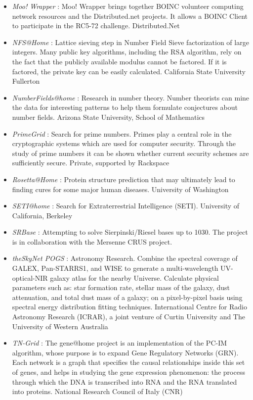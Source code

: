 \begin{itemize}
	\item {\em Moo! Wrapper} : Moo! Wrapper brings together BOINC volunteer computing network resources and the Distributed.net projects. It allows a BOINC Client to participate in the RC5-72 challenge.	Distributed.Net	
	\item {\em NFS@Home} : Lattice sieving step in Number Field Sieve factorization of large integers. Many public key algorithms, including the RSA algorithm, rely on the fact that the publicly available modulus cannot be factored. If it is factored, the private key can be easily calculated.	California State University Fullerton	
	\item {\em NumberFields@home} : Research in number theory. Number theorists can mine the data for interesting patterns to help them formulate conjectures about number fields.	Arizona State University, School of Mathematics	
	\item {\em PrimeGrid} : Search for prime numbers. Primes play a central role in the cryptographic systems which are used for computer security. Through the study of prime numbers it can be shown whether current security schemes are sufficiently secure.	Private, supported by Rackspace
	\item {\em Rosetta@Home} : Protein structure prediction that may ultimately lead to finding cures for some major human diseases.	University of Washington
	\item {\em SETI@home} : Search for Extraterrestrial Intelligence (SETI). University of California, Berkeley
	\item {\em SRBase} : Attempting to solve Sierpinski/Riesel bases up to 1030.	The project is in collaboration with the Mersenne CRUS project.	
	\item {\em theSkyNet POGS} : Astronomy Research. Combine the spectral coverage of GALEX, Pan-STARRS1, and WISE to generate a multi-wavelength UV-optical-NIR galaxy atlas for the nearby Universe. Calculate physical parameters such as: star formation rate, stellar mass of the galaxy, dust attenuation, and total dust mass of a galaxy; on a pixel-by-pixel basis using spectral energy distribution fitting techniques.	International Centre for Radio Astronomy Research (ICRAR), a joint venture of Curtin University and The University of Western Australia	
	\item {\em TN-Grid} : The gene@home project is an implementation of the PC-IM algorithm, whose purpose is to expand Gene Regulatory Networks (GRN). Each network is a graph that specifies the causal relationships inside this set of genes, and helps in studying the gene expression phenomenon: the process through which the DNA is transcribed into RNA and the RNA translated into proteins.	National Research Council of Italy (CNR)

\end{itemize}

